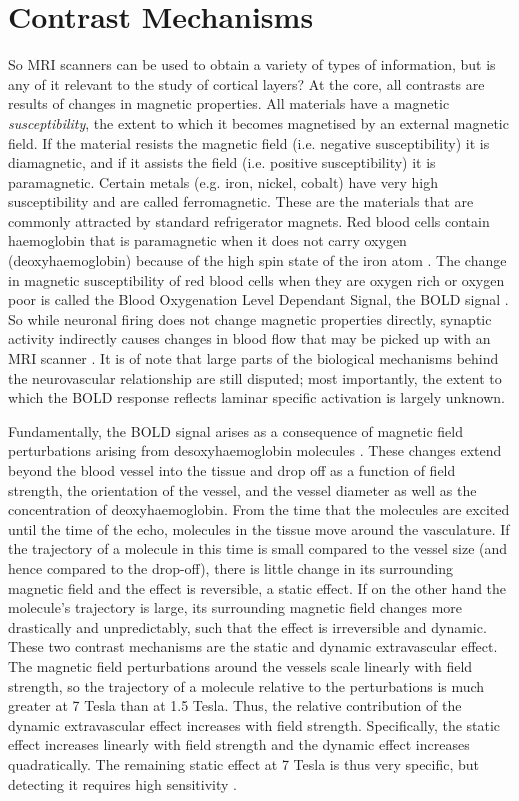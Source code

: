\section*{Contrast Mechanisms}
So MRI scanners can be used to obtain a variety of types of information, but is any of it relevant to the study of cortical layers? At the core, all contrasts are results of changes in magnetic properties. All materials have a magnetic \emph{susceptibility}, the extent to which it becomes magnetised by an external magnetic field. If the material resists the magnetic field (i.e. negative susceptibility) it is diamagnetic, and if it assists the field (i.e. positive susceptibility) it is paramagnetic. Certain metals (e.g. iron, nickel, cobalt) have very high susceptibility and are called ferromagnetic. These are the materials that are commonly attracted by standard refrigerator magnets. Red blood cells contain haemoglobin that is paramagnetic when it does not carry oxygen (deoxyhaemoglobin) because of the high spin state of the iron atom \cite{Pauling1936}. The change in magnetic susceptibility of red blood cells when they are oxygen rich or oxygen poor is called the Blood Oxygenation Level Dependant Signal, the BOLD signal \cite{Ogawa1990}. So while neuronal firing does not change magnetic properties directly, synaptic activity indirectly causes changes in blood flow that may be picked up with an MRI scanner \cite{Logothetis2006}. It is of note that large parts of the biological mechanisms behind the neurovascular relationship are still disputed; most importantly, the extent to which the BOLD response reflects laminar specific activation is largely unknown.

Fundamentally, the BOLD signal arises as a consequence of magnetic field perturbations arising from desoxyhaemoglobin molecules \cite{Norris2006}. These changes extend beyond the blood vessel into the tissue and drop off as a function of field strength, the orientation of the vessel, and the vessel diameter as well as the concentration of deoxyhaemoglobin. From the time that the molecules are excited until the time of the echo, molecules in the tissue move around the vasculature. If the trajectory of a molecule in this time is small compared to the vessel size (and hence compared to the drop-off), there is little change in its surrounding magnetic field and the effect is reversible, a static effect. If on the other hand the molecule's trajectory is large, its surrounding magnetic field changes more drastically and unpredictably, such that the effect is irreversible and dynamic. These two contrast mechanisms are the static and dynamic extravascular effect. The magnetic field perturbations around the vessels scale linearly with field strength, so the trajectory of a molecule relative to the perturbations is much greater at 7 Tesla than at 1.5 Tesla. Thus, the relative contribution of the dynamic extravascular effect increases with field strength. Specifically, the static effect increases linearly with field strength and the dynamic effect increases quadratically. The remaining static effect at 7 Tesla is thus very specific, but detecting it requires high sensitivity \cite{Panchuelo2014}.

